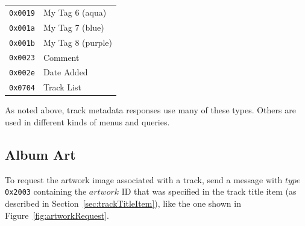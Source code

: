 \documentclass[11pt]{article}
\begin{document}
\begin{samepage}
\begin{center}
\begin{tabu}{rl}
      {\tt 0x0019} & My Tag 6 (aqua) \\

      {\tt 0x001a} & My Tag 7 (blue) \\

      {\tt 0x001b} & My Tag 8 (purple) \\

      {\tt 0x0023} & Comment \\

      {\tt 0x002e} & Date Added \\

      {\tt 0x0704} & Track List \\

      \bottomrule
    \end{tabu}
  \end{center}

  As noted above, track metadata responses use many of these types.
  Others are used in different kinds of menus and queries.
\end{samepage}

\subsection{Album Art}
\label{sec:albumArt}

To request the artwork image associated with a track, send a message
with $type$ {\tt 0x2003} containing the $artwork$ ID that was
specified in the track title item (as described in
Section~\ref{sec:trackTitleItem}), like the one shown in
Figure~\ref{fig:artworkRequest}.
\end{document}
